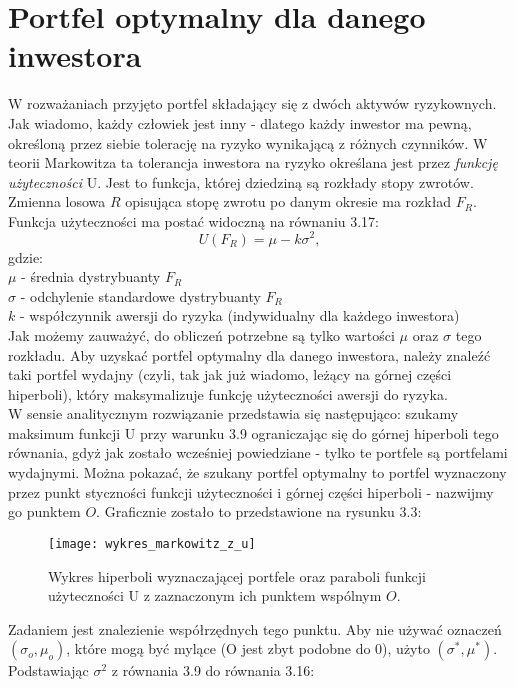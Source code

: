 \documentclass[magister]{dyplom}
\begin{document}
\section{Portfel optymalny dla danego inwestora}
W rozważaniach przyjęto portfel składający się z dwóch aktywów ryzykownych. Jak wiadomo, każdy człowiek jest inny - dlatego każdy inwestor ma pewną, określoną przez siebie tolerację na ryzyko wynikającą z różnych czynników. W teorii Markowitza ta tolerancja inwestora na ryzyko określana jest przez \textit{funkcję użyteczności} U. Jest to funkcja, której dziedziną są rozkłady stopy zwrotów. Zmienna losowa $R$ opisująca stopę zwrotu po danym okresie ma rozkład $F_R$. Funkcja użyteczności ma postać widoczną na równaniu 3.17:
\begin{equation}
U(F_R) = \mu - k\sigma^2,
\end{equation}
gdzie:\\
$\mu$ - średnia dystrybuanty $F_R$\\
$\sigma$ - odchylenie standardowe dystrybuanty $F_R$\\
$k$ - współczynnik awersji do ryzyka (indywidualny dla każdego inwestora)\\
Jak możemy zauważyć, do obliczeń potrzebne są tylko wartości $\mu$ oraz $\sigma$ tego rozkładu. Aby uzyskać portfel optymalny dla danego inwestora, należy znaleźć taki portfel wydajny (czyli, tak jak już wiadomo, leżący na górnej części hiperboli), który maksymalizuje funkcję użyteczności awersji do ryzyka.\\
W sensie analitycznym rozwiązanie przedstawia się następująco: szukamy maksimum funkcji U przy warunku 3.9 ograniczając się do górnej hiperboli tego równania, gdyż jak zostało wcześniej powiedziane - tylko te portfele są portfelami wydajnymi. Można pokazać, że szukany portfel optymalny to portfel wyznaczony przez punkt styczności funkcji użyteczności i górnej części hiperboli - nazwijmy go punktem $O$. Graficznie zostało to przedstawione na rysunku 3.3:\\
\newpage
\begin{figure}[h]
	\centering
	\texttt{[image: wykres\_markowitz\_z\_u]}
	\caption{Wykres hiperboli wyznaczającej portfele oraz paraboli funkcji użyteczności U z zaznaczonym ich punktem wspólnym $O$.}
\end{figure}

Zadaniem jest znalezienie współrzędnych tego punktu. Aby nie używać oznaczeń $(\sigma_o, \mu_o)$, które mogą być mylące (O jest zbyt podobne do 0), użyto $(\sigma^*, \mu^*)$. Podstawiając $\sigma^2$ z równania 3.9 do równania 3.16:
\end{document}
